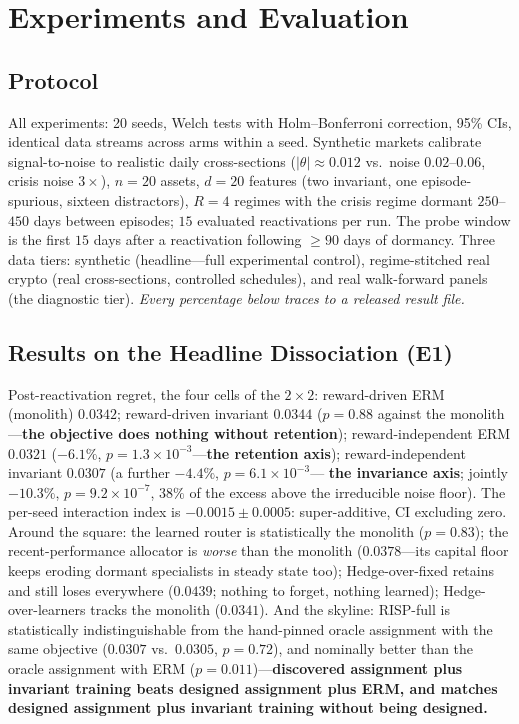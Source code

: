 \documentclass[10pt]{article}
\newcommand{\nm}{\textsc{RISP}}
\begin{document}
\section{Experiments and Evaluation}
\label{sec:experiments}

\subsection{Protocol}

All experiments: 20 seeds, Welch tests with Holm--Bonferroni correction,
95\% CIs, identical data streams across arms within a seed. Synthetic
markets calibrate signal-to-noise to realistic daily cross-sections
($|\theta| \approx 0.012$ vs.\ noise $0.02$--$0.06$, crisis noise
$3\times$), $n = 20$ assets, $d = 20$ features (two invariant, one
episode-spurious, sixteen distractors), $R = 4$ regimes with the crisis
regime dormant $250$--$450$ days between episodes; $15$ evaluated
reactivations per run. The probe window is the first $15$ days after a
reactivation following $\ge 90$ days of dormancy. Three data tiers:
synthetic (headline---full experimental control), regime-stitched real
crypto (real cross-sections, controlled schedules), and real walk-forward
panels (the diagnostic tier). \emph{Every percentage below traces to a
released result file.}

\subsection{Results on the Headline Dissociation (E1)}

Post-reactivation regret, the four cells of the $2{\times}2$:
reward-driven ERM (monolith) $0.0342$; reward-driven invariant $0.0344$
($p = 0.88$ against the monolith---\textbf{the objective does nothing
without retention}); reward-independent ERM $0.0321$ ($-6.1\%$,
$p = 1.3 \times 10^{-3}$---\textbf{the retention axis}); reward-independent
invariant $0.0307$ (a further $-4.4\%$, $p = 6.1 \times 10^{-3}$---%
\textbf{the invariance axis}; jointly $-10.3\%$,
$p = 9.2 \times 10^{-7}$, $38\%$ of the excess above the irreducible
noise floor). The per-seed interaction index is $-0.0015 \pm 0.0005$:
super-additive, CI excluding zero. Around the square: the learned router
is statistically the monolith ($p = 0.83$); the recent-performance
allocator is \emph{worse} than the monolith ($0.0378$---its capital floor
keeps eroding dormant specialists in steady state too); Hedge-over-fixed
retains and still loses everywhere ($0.0439$; nothing to forget, nothing
learned); Hedge-over-learners tracks the monolith ($0.0341$). And the
skyline: \nm{}-full is statistically indistinguishable from the
hand-pinned oracle assignment with the same objective ($0.0307$ vs.\
$0.0305$, $p = 0.72$), and nominally better than the oracle assignment
with ERM ($p = 0.011$)---\textbf{discovered assignment plus invariant
training beats designed assignment plus ERM, and matches designed
assignment plus invariant training without being designed.}
\end{document}
